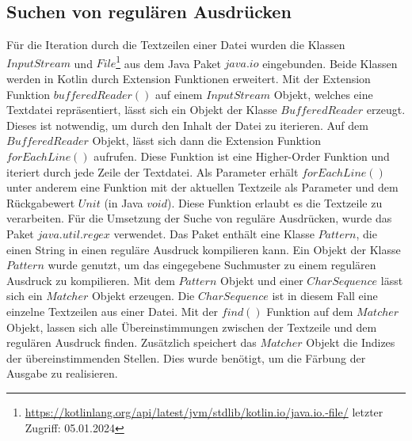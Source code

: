 \documentclass{article}
\begin{document}
\subsection{Suchen von regulären Ausdrücken}
Für die Iteration durch die Textzeilen einer Datei wurden die Klassen $InputStream$ und $File$\footnote{\url{https://kotlinlang.org/api/latest/jvm/stdlib/kotlin.io/java.io.-file/} letzter Zugriff: 05.01.2024} aus dem Java Paket $java.io$ eingebunden. Beide Klassen werden in Kotlin durch Extension Funktionen erweitert. Mit der Extension Funktion $bufferedReader()$ auf einem $InputStream$ Objekt, welches eine Textdatei repräsentiert, lässt sich ein Objekt der Klasse $BufferedReader$ erzeugt. Dieses ist notwendig, um durch den Inhalt der Datei zu iterieren. Auf dem $BufferedReader$ Objekt, lässt sich dann die Extension Funktion $forEachLine()$ aufrufen. Diese Funktion ist eine Higher-Order Funktion und iteriert durch jede Zeile der Textdatei. Als Parameter erhält $forEachLine()$ unter anderem eine Funktion mit der aktuellen Textzeile als Parameter und dem Rückgabewert $Unit$ (in Java $void$). Diese Funktion erlaubt es die Textzeile zu verarbeiten. \newline
Für die Umsetzung der Suche von reguläre Ausdrücken, wurde das Paket $java.util.regex$ verwendet. Das Paket enthält eine Klasse $Pattern$, die einen String in einen reguläre Ausdruck kompilieren kann. Ein Objekt der Klasse $Pattern$ wurde genutzt, um das eingegebene Suchmuster zu einem regulären Ausdruck zu kompilieren. Mit dem $Pattern$ Objekt und einer $CharSequence$ lässt sich ein $Matcher$ Objekt erzeugen. Die $CharSequence$ ist in diesem Fall eine einzelne Textzeilen aus einer Datei. Mit der $find()$ Funktion auf dem $Matcher$ Objekt, lassen sich alle Übereinstimmungen zwischen der Textzeile und dem regulären Ausdruck finden. Zusätzlich speichert das $Matcher$ Objekt die Indizes der übereinstimmenden Stellen. Dies wurde benötigt, um die Färbung der Ausgabe zu realisieren.
\end{document}
